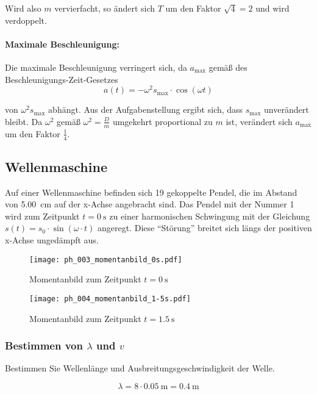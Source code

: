 \documentclass{ajc}
\begin{document}
	Wird also $m$ vervierfacht, so ändert sich $T$ um den Faktor $\sqrt{4} = 2$ und wird verdoppelt.
	
	\paragraph{Maximale Beschleunigung:} Die maximale Beschleunigung verringert sich, da $a_\text{max}$ gemäß des Beschleunigungs-Zeit-Gesetzes 
	\begin{equation}
		a(t) = -\omega^2 s_\text{max} \cdot \cos\left(\omega t\right)
	\end{equation}
	
	von $\omega^2 s_\text{max}$ abhängt. Aus der Aufgabenstellung ergibt sich, dass $s_\text{max}$ unverändert bleibt. Da $\omega^2$ gemäß $\omega^2 = \frac{D}{m}$ umgekehrt proportional zu $m$ ist, verändert sich $a_\text{max}$ um den Faktor $\frac{1}{4}$.
	
	\newpage
	
	\subsection{Wellenmaschine}
	Auf einer Wellenmaschine befinden sich 19 gekoppelte Pendel, die im Abstand von \SI{5,00}{\centi\meter} auf der x-Achse angebracht sind. Das Pendel mit der Nummer 1 wird zum Zeitpunkt $t = \SI{0}{\second}$ zu einer harmonischen Schwingung mit der Gleichung $s(t) = s_0 \cdot \sin(\omega \cdot t)$ angeregt. Diese \enquote{Störung} breitet sich längs der positiven x-Achse ungedämpft aus.
	
	\begin{figure}[ht]
		\centering
		\texttt{[image: ph\_003\_momentanbild\_0s.pdf]}
		\caption{Momentanbild zum Zeitpunkt $t = \SI{0}{\second}$}
		\label{fig:mom_0s}
	\end{figure}
	
	\begin{figure}[ht]
		\centering
		\texttt{[image: ph\_004\_momentanbild\_1-5s.pdf]}
		\caption{Momentanbild zum Zeitpunkt $t = \SI{1,5}{\second}$}
		\label{fig:mom_1.5s}
	\end{figure}
	
	\subsubsection{Bestimmen von $\lambda$ und $v$}
	Bestimmen Sie Wellenlänge und Ausbreitungsgeschwindigkeit der Welle.
	
	\begin{equation}
		\lambda = 8 \cdot \SI{0,05}{\m} = \SI{0,4}{\m}
	\end{equation}
	
\end{document}
